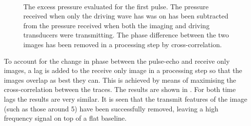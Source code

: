 \begin{figure}[t]%
  \centering
 \quad
 \quad
  \\
 \quad
 \quad
\caption{
    The excess pressure evaluated for the first pulse.  
    The pressure received when only the driving wave has was on has been subtracted from the pressure received when both the imaging and driving transducers were transmitting.
    The phase difference between the two images has been removed in a processing step by cross-correlation.
  }
  \label{fig:exp:1st:av:time:comp:control:cross}
\end{figure}

To account for the change in phase between the pulse-echo and receive only images,
a lag is added to the receive only image in a processing step so that the images 
overlap as best they can.  
This is achieved by means of maximising the cross-correlation between the traces.
The results are shown in .
For both time lags the results are very similar.
It is seen that the transmit features of the image (such as those around \unit{5}\micro\second) 
have been successfully removed, leaving a high frequency signal on top of a flat baseline.

